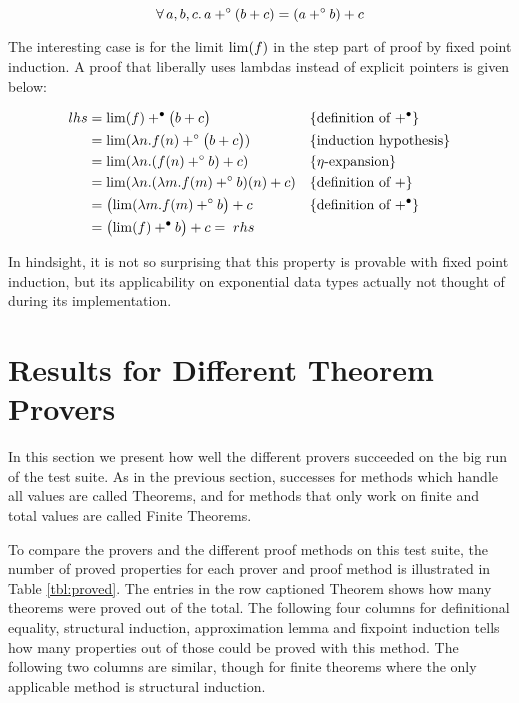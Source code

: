 \begin{equation*}
\forall \, a , b , c . \, a +^{\circ} (b + c) = (a +^{\circ} b) + c
\end{equation*}

\noindent
The interesting case is for the limit $\mathrm{lim}(f)$ in the step part of
proof by fixed point induction. A proof that liberally uses
lambdas instead of explicit pointers is given below:

\begin{align*}
lhs = & \; \mathrm{lim} (f) +^{\bullet} \big(b + c\big)                               && \{\textrm{definition of $+^{\bullet}$}\}\\
    = & \; \mathrm{lim} (\lambda n . f(n) +^{\circ} \big(b + c\big))                && \{\textrm{induction hypothesis}\}\\
    = & \; \mathrm{lim} (\lambda n . (f(n) +^{\circ} b) + c)                && \{\textrm{$\eta$-expansion}\}\\
    = & \; \mathrm{lim} (\lambda n . (\lambda m . f(m) +^{\circ} b)(n) + c) && \{\textrm{definition of $+$}\}\\
    = & \; \big(\mathrm{lim} (\lambda m . f(m) +^{\circ} b\big) + c                 && \{\textrm{definition of $+^{\bullet}$}\}\\
    = & \; \big(\mathrm{lim} (f) +^{\bullet} b\big) + c = \; rhs
\end{align*}

In hindsight, it is not so surprising that this property is provable
with fixed point induction, but its applicability on exponential data
types actually not thought of during its implementation.

\section{Results for Different Theorem Provers}

In this section we present how well the different provers succeeded on
the big run of the test suite. As in the previous section, successes for
methods which handle all values are called Theorems, and for methods
that only work on finite and total values are called Finite Theorems.

To compare the provers and the different proof methods on this test
suite, the number of proved properties for each prover and proof
method is illustrated in Table \ref{tbl:proved}. The entries in the
row captioned Theorem shows how many theorems were proved out of the
total. The following four columns for definitional equality,
structural induction, approximation lemma and fixpoint induction tells
how many properties out of those could be proved with this method. The
following two columns are similar, though for finite theorems where the
only applicable method is structural induction.

